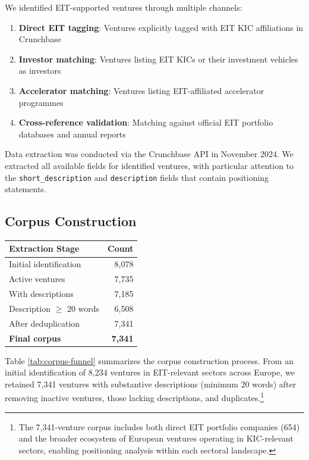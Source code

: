 \documentclass[../main.tex]{subfiles}
\begin{document}
We identified EIT-supported ventures through multiple channels:
\begin{enumerate}
    \item \textbf{Direct EIT tagging}: Ventures explicitly tagged with EIT KIC affiliations in Crunchbase
    \item \textbf{Investor matching}: Ventures listing EIT KICs or their investment vehicles as investors
    \item \textbf{Accelerator matching}: Ventures listing EIT-affiliated accelerator programmes
    \item \textbf{Cross-reference validation}: Matching against official EIT portfolio databases and annual reports
\end{enumerate}

Data extraction was conducted via the Crunchbase API in November 2024. We extracted all available fields for identified ventures, with particular attention to the \texttt{short\_description} and \texttt{description} fields that contain positioning statements.

\subsection{Corpus Construction}

\begin{margintable}
\centering
\small
\begin{tabular}{lr}
\toprule
\textbf{Extraction Stage} & \textbf{Count} \\
\midrule
Initial identification & 8,078 \\
Active ventures & 7,735 \\
With descriptions & 7,185 \\
Description $\geq$ 20 words & 6,508 \\
After deduplication & 7,341 \\
\midrule
\textbf{Final corpus} & \textbf{7,341} \\
\bottomrule
\end{tabular}
\caption{Corpus construction funnel}
\end{margintable}

Table \ref{tab:corpus-funnel} summarizes the corpus construction process. From an initial identification of 8,234 ventures in EIT-relevant sectors across Europe, we retained 7,341 ventures with substantive descriptions (minimum 20 words) after removing inactive ventures, those lacking descriptions, and duplicates.\footnote{The 7,341-venture corpus includes both direct EIT portfolio companies (654) and the broader ecosystem of European ventures operating in KIC-relevant sectors, enabling positioning analysis within each sectoral landscape.}
\end{document}
